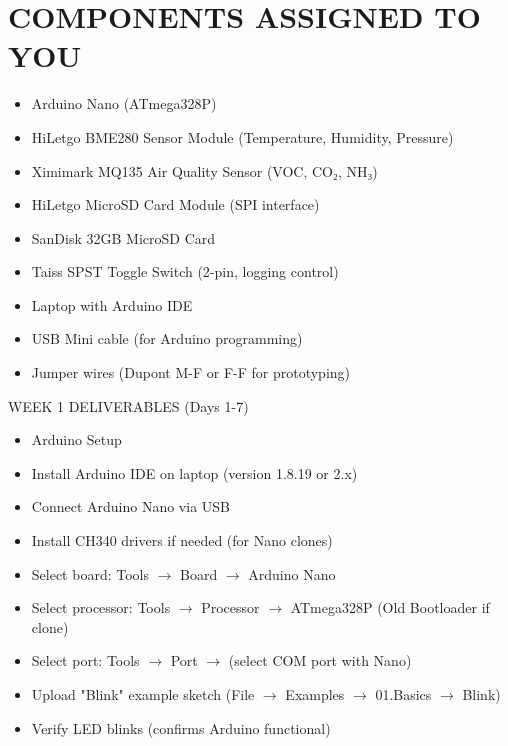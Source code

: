 \documentclass[11pt,letterpaper]{article}
\begin{document}
\section{COMPONENTS ASSIGNED TO YOU}

\begin{itemize}
  \item Arduino Nano (ATmega328P)
  \item HiLetgo BME280 Sensor Module (Temperature, Humidity, Pressure)
  \item Ximimark MQ135 Air Quality Sensor (VOC, CO₂, NH₃)
  \item HiLetgo MicroSD Card Module (SPI interface)
  \item SanDisk 32GB MicroSD Card
  \item Taiss SPST Toggle Switch (2-pin, logging control)
  \item Laptop with Arduino IDE
  \item USB Mini cable (for Arduino programming)
  \item Jumper wires (Dupont M-F or F-F for prototyping)
\end{itemize}

WEEK 1 DELIVERABLES (Days 1-7)\par

\begin{itemize}
  \item Arduino Setup
  \item Install Arduino IDE on laptop (version 1.8.19 or 2.x)
  \item Connect Arduino Nano via USB
  \item Install CH340 drivers if needed (for Nano clones)
  \item Select board: Tools $\rightarrow$ Board $\rightarrow$ Arduino Nano
  \item Select processor: Tools $\rightarrow$ Processor $\rightarrow$ ATmega328P (Old Bootloader if clone)
  \item Select port: Tools $\rightarrow$ Port $\rightarrow$ (select COM port with Nano)
  \item Upload "Blink" example sketch (File $\rightarrow$ Examples $\rightarrow$ 01.Basics $\rightarrow$ Blink)
  \item Verify LED blinks (confirms Arduino functional)
\end{itemize}
\end{document}
